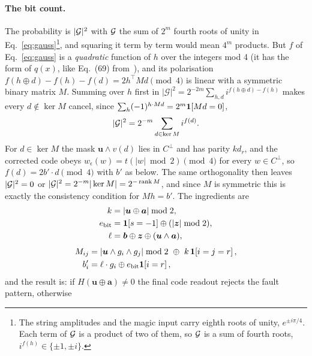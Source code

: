 \paragraph{The bit count.} The probability is $|{\cal G}|^2$ with ${\cal G}$ the sum of $2^m$ fourth roots of unity in Eq.~\eqref{eq:gauss}\footnote{The string amplitudes and the magic input carry eighth roots of unity, $e^{\pm i\pi/4}$. Each term of ${\cal G}$ is a product of two of them, so ${\cal G}$ is a sum of fourth roots, $i^{f(h)}\in\{\pm1,\pm i\}$.}, and squaring it term by term would mean $4^m$ products. But $f$ of Eq.~\eqref{eq:gauss} is a \emph{quadratic} function of $h$ over the integers mod 4 (it has the form of $q(x)$, like Eq.~(69) from~\cite{Bravyi_2019}), and its polarisation $f(h\oplus d)-f(h)-f(d)=2h^{\!\top}Md \pmod 4$ is linear with a symmetric binary matrix $M$.
Summing over $h$ first in $|\mathcal G|^2=2^{-2m}\sum_{h,d}i^{f(h\oplus d)-f(h)}$ makes every $d\notin\ker M$ cancel, since $\sum_{h}(-1)^{h\cdot Md}=2^m\mathbf1\!\left[Md=0\right]$,
\begin{equation}
 |{\cal G}|^2=2^{-m}\sum_{d\in\ker M}i^{f(d)} .
 \label{eq:gausssquare}
\end{equation}
For $d\in\ker M$ the mask $\boldsymbol u\wedge v(d)$ lies in $C^\perp$ and has parity $kd_r$, and the corrected code obeys $w_\epsilon(w)=t(|w|\bmod2)\pmod4$ for every $w\in C^\perp$, so $f(d)=2b'\cdot d\pmod 4$ with $b'$ as below. The same orthogonality then leaves $|{\cal G}|^2=0$ or $|{\cal G}|^2=2^{-m}|\ker M|=2^{-\operatorname{rank} M}$, and since $M$ is symmetric this is exactly the consistency condition for $Mh=b'$. The ingredients are
\begin{equation}
 \begin{aligned}
 k&=|\boldsymbol u\oplus\boldsymbol a|\bmod2,\\
 e_{\rm bit}&=\mathbf1\!\left[s=-1\right]\oplus(|\boldsymbol z|\bmod2),\\
 \ell&=\boldsymbol b\oplus\boldsymbol z\oplus(\boldsymbol u\wedge\boldsymbol a),
 \end{aligned}
 \label{eq:binaryparameters}
\end{equation}
\begin{equation}
 \begin{aligned}
 M_{ij}&=|\boldsymbol u\wedge g_i\wedge g_j|\bmod2\ \oplus\ k\,\ind{i=j=r},\\
 b'_i&=\ell\cdot g_i\oplus e_{\rm bit}\ind{i=r},
 \end{aligned}
 \label{eq:countmatrix}
\end{equation}
and the result is: if $H(\boldsymbol u\oplus\boldsymbol a)\ne0$ the final code readout rejects the fault pattern, otherwise
